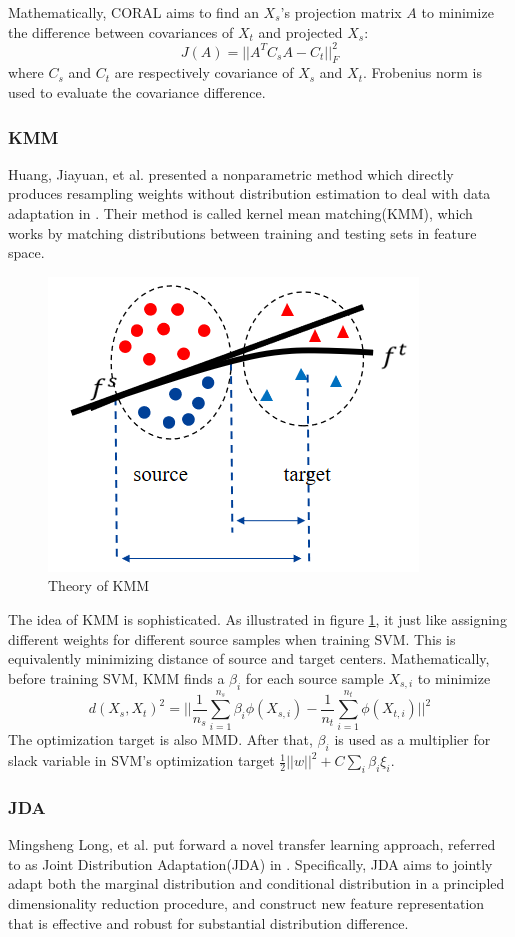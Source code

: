 \documentclass[conference]{IEEEtran}
\begin{document}
Mathematically, CORAL aims to find an $X_s$'s projection matrix $A$ to minimize the difference between covariances of $X_t$ and projected $X_s$:
\begin{equation}
J(A) = ||A^TC_sA-C_t||_F^2
\end{equation}
where $C_s$ and $C_t$ are respectively covariance of $X_s$ and $X_t$. Frobenius norm is used to evaluate the covariance difference.

\subsubsection{KMM}
Huang, Jiayuan, et al. presented a nonparametric method which directly produces resampling weights without distribution estimation to deal with data adaptation in \cite{KMM}. Their method is called kernel mean matching(KMM), which works by matching distributions between training and testing sets in feature space.
\begin{figure}
  \centering
  \includegraphics[width=.4\textwidth]{LKMM_theorem1.png}
  \caption{Theory of KMM}
  \label{KMM_theorem}
\end{figure}
The idea of KMM is sophisticated. As illustrated in figure \ref{KMM_theorem}, it just like assigning different weights for different source samples when training SVM. This is equivalently minimizing distance of source and target centers.
Mathematically, before training SVM, KMM finds a $\beta_i$ for each source sample $X_{s,i}$ to minimize
\begin{equation}
d(X_s, X_t)^2 = ||\frac{1}{n_s} \sum\limits_{i=1}^{n_s}\beta_i \phi(X_{s,i}) - \frac{1}{n_t} \sum\limits_{i=1}^{n_t} \phi(X_{t,i}) ||^2
\end{equation}
The optimization target is also MMD. After that, $\beta_i$ is used as a multiplier for slack variable in SVM's optimization target $\frac{1}{2}||w||^2+C\sum\limits_{i}\beta_i \xi_i$.

\subsubsection{JDA}
Mingsheng Long, et al. put forward a novel transfer learning approach, referred to as Joint Distribution Adaptation(JDA) in \cite{JDA}. Specifically, JDA aims to jointly adapt both the marginal distribution and conditional distribution in a principled dimensionality reduction procedure, and construct new feature representation that is effective and robust for substantial distribution difference.
\end{document}
